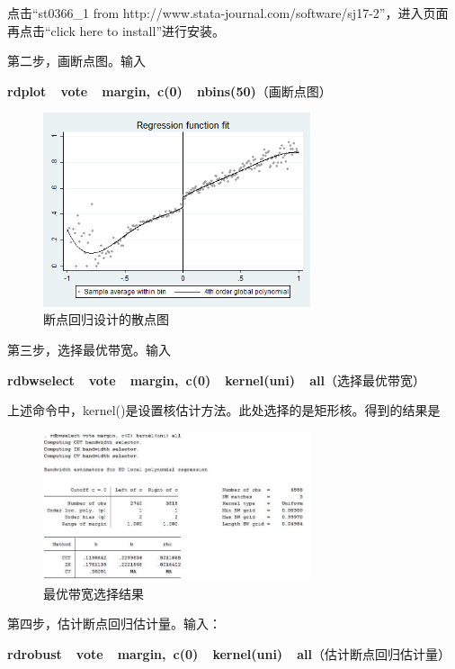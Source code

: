 \documentclass[cn,12pt,math=newtx,citestyle=gb7714-2015,bibstyle=gb7714-2015]{elegantbook}
\begin{document}
	点击“st0366\_1 from http://www.stata-journal.com/software/sj17-2”，进入页面再点击“click here to install”进行安装。
	
	第二步，画断点图。输入
	
	\textbf{rdplot~~vote~~margin,~c(0)~~nbins(50)}（画断点图）
	
	\begin{figure}[htbp]
		\centering
		\includegraphics[width=0.7\textwidth]{rdgraph.png}
		\caption{断点回归设计的散点图}\label{fig:digit}
	\end{figure}
	
	第三步，选择最优带宽。输入
	
	\textbf{rdbwselect~~vote~~margin,~c(0)~~kernel(uni)~~all}（选择最优带宽）
	
	上述命令中，kernel()是设置核估计方法。此处选择的是矩形核。得到的结果是
	
	\begin{figure}[htbp]
		\centering
		\includegraphics[width=0.7\textwidth]{rdbw.jpg}
		\caption{最优带宽选择结果}\label{fig:digit}
	\end{figure}
	
	第四步，估计断点回归估计量。输入：
	
	\textbf{rdrobust~~vote~~margin,~c(0)~~kernel(uni)~~all}（估计断点回归估计量）
	
\end{document}
